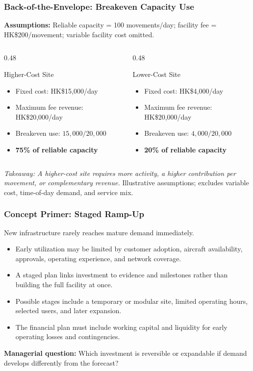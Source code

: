 \documentclass{beamer}
\begin{document}
\begin{frame}[t,shrink=10]
\frametitle{Back-of-the-Envelope: Breakeven Capacity Use}
\textbf{Assumptions:} Reliable capacity = 100 movements/day; facility fee = HK\$200/movement; variable facility cost omitted.
\begin{columns}[T]
\begin{column}{0.48\textwidth}\begin{block}{Higher-Cost Site}
\begin{itemize}
\item Fixed cost: HK\$15,000/day
\item Maximum fee revenue: HK\$20,000/day
\item Breakeven use: $15{,}000/20{,}000$
\item \textbf{75\% of reliable capacity}
\end{itemize}\end{block}\end{column}
\begin{column}{0.48\textwidth}\begin{block}{Lower-Cost Site}
\begin{itemize}
\item Fixed cost: HK\$4,000/day
\item Maximum fee revenue: HK\$20,000/day
\item Breakeven use: $4{,}000/20{,}000$
\item \textbf{20\% of reliable capacity}
\end{itemize}\end{block}\end{column}
\end{columns}
\textit{Takeaway: A higher-cost site requires more activity, a higher contribution per movement, or complementary revenue.}
\vfill{\tiny Illustrative assumptions; excludes variable cost, time-of-day demand, and service mix.}
\end{frame}

\begin{frame}[t]
\frametitle{Concept Primer: Staged Ramp-Up}
New infrastructure rarely reaches mature demand immediately.
\begin{itemize}
\item Early utilization may be limited by customer adoption, aircraft availability, approvals, operating experience, and network coverage.
\item A staged plan links investment to evidence and milestones rather than building the full facility at once.
\item Possible stages include a temporary or modular site, limited operating hours, selected users, and later expansion.
\item The financial plan must include working capital and liquidity for early operating losses and contingencies.
\end{itemize}
\textbf{Managerial question:} Which investment is reversible or expandable if demand develops differently from the forecast?
\end{frame}
\end{document}
